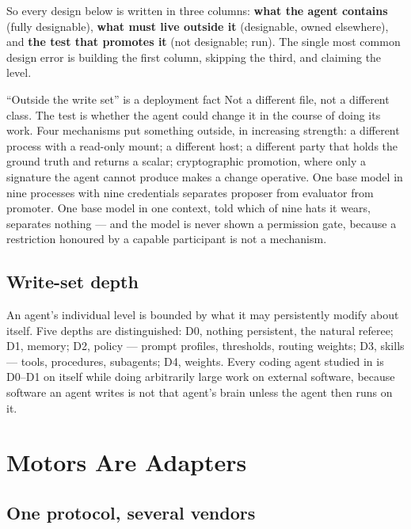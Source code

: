 So every design below is written in three columns: \textbf{what the agent contains} (fully designable), \textbf{what must live outside it} (designable, owned elsewhere), and \textbf{the test that promotes it} (not designable; run). The single most common design error is building the first column, skipping the third, and claiming the level.

\begin{cautionbox}{``Outside the write set'' is a deployment fact}
Not a different file, not a different class. The test is whether the agent could change it in the course of doing its work. Four mechanisms put something outside, in increasing strength: a different process with a read-only mount; a different host; a different party that holds the ground truth and returns a scalar; cryptographic promotion, where only a signature the agent cannot produce makes a change operative. One base model in nine processes with nine credentials separates proposer from evaluator from promoter. One base model in one context, told which of nine hats it wears, separates nothing --- and the model is never shown a permission gate, because a restriction honoured by a capable participant is not a mechanism.
\end{cautionbox}

\subsection{Write-set depth}

An agent's individual level is bounded by what it may persistently modify about itself. Five depths are distinguished: D0, nothing persistent, the natural referee; D1, memory; D2, policy --- prompt profiles, thresholds, routing weights; D3, skills --- tools, procedures, subagents; D4, weights. Every coding agent studied in \citet{yang2026capability} is D0--D1 on itself while doing arbitrarily large work on external software, because software an agent writes is not that agent's brain unless the agent then runs on it.

\section{Motors Are Adapters}\label{sec:motors}

\subsection{One protocol, several vendors}

